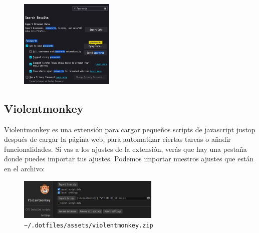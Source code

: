 \documentclass[11pt]{article}
\begin{document}
\vspace{-15pt}

\begin{figure}[h!]
{\includegraphics[width=0.4\textwidth,height=0.31\textwidth]{images/passwords.jpg}}
\end{figure}%

\subsection{Violentmonkey}

Violentmonkey es una extensión para cargar pequeños scripts de javascript justop después de cargar la página web, para automatizar ciertas tareas o añadir funcionalidades. Si vas a los ajustes de la extensión, verás que hay una pestaña donde puedes importar tus ajustes. Podemos importar nuestros ajustes que están en el archivo:

\begin{figure}[h!]
	\captionsetup{labelformat=empty}
	\centering
	\includegraphics[width=0.6\textwidth]{images/violentmonkey.jpg}
	\cprotect\caption{\verb|~/.dotfiles/assets/violentmonkey.zip|}
\end{figure}

\vspace{-20pt}
\end{document}

